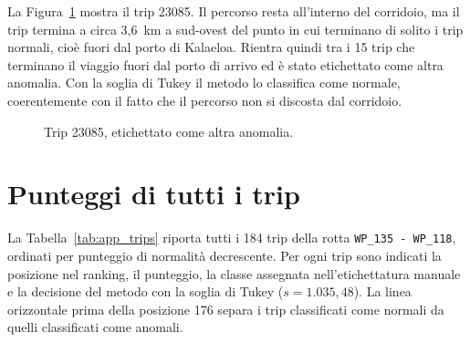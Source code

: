 La Figura~\ref{fig:app_label_other} mostra il trip 23085. Il percorso resta all'interno del
corridoio, ma il trip termina a circa 3,6~km a sud-ovest del punto in cui terminano di solito i
trip normali, cioè fuori dal porto di Kalaeloa. Rientra quindi tra i 15 trip che terminano il
viaggio fuori dal porto di arrivo ed è stato etichettato come altra anomalia. Con la soglia di
Tukey il metodo lo classifica come normale, coerentemente con il fatto che il percorso non si
discosta dal corridoio.

\begin{figure}[htbp]
    \centering
    \caption{Trip 23085, etichettato come altra anomalia.}\label{fig:app_label_other}
\end{figure}

\chapter{Punteggi di tutti i trip}\label{app:trips}

La Tabella~\ref{tab:app_trips} riporta tutti i 184 trip della rotta \texttt{WP\_135 - WP\_118},
ordinati per punteggio di normalità decrescente. Per ogni trip sono indicati la posizione nel
ranking, il punteggio, la classe assegnata nell'etichettatura manuale e la decisione del metodo
con la soglia di Tukey ($s = 1.035{,}48$). La linea orizzontale prima della posizione 176 separa
i trip classificati come normali da quelli classificati come anomali.

